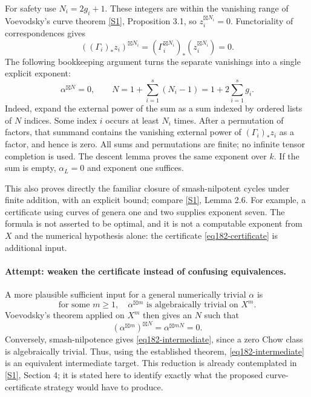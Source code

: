 \documentclass[11pt,a4paper]{article}
\newcommand{\sref}[2]{\hyperlink{source:#1:#2}{[S#2]}}
\numberwithin{equation}{section}
\begin{document}
For safety use $N_i=2g_i+1$. These integers are within the vanishing range
of Voevodsky's curve theorem \sref{30006776}{1}, Proposition 3.1, so
$z_i^{\boxtimes N_i}=0$. Functoriality of correspondences gives
\[
 ((\Gamma_i)_*z_i)^{\boxtimes N_i}
             =(\Gamma_i^{\boxtimes N_i})_*
                            (z_i^{\boxtimes N_i})=0.
\]
The following bookkeeping argument turns the separate vanishings into a
single explicit exponent:
\begin{equation}\label{eq182-exponent}
           \alpha^{\boxtimes N}=0,
             \qquad N=1+\sum_{i=1}^s(N_i-1)
                         =1+2\sum_{i=1}^s g_i.
\end{equation}
Indeed, expand the external power of the sum as a sum indexed by ordered
lists of $N$ indices. Some index $i$ occurs at least $N_i$ times. After a
permutation of factors, that summand contains the vanishing external power
of $(\Gamma_i)_*z_i$ as a factor, and hence is zero. All sums and
permutations are finite; no infinite tensor completion is used. The
descent lemma proves the same exponent over $k$. If the sum is empty,
$\alpha_L=0$ and exponent one suffices.

This also proves directly the familiar closure of smash-nilpotent cycles
under finite addition, with an explicit bound; compare
\sref{30006776}{1}, Lemma 2.6. For example, a certificate using curves of genera
one and two supplies exponent seven. The formula is not asserted to be
optimal, and it is not a computable exponent from $X$ and the numerical
hypothesis alone: the certificate \eqref{eq182-certificate} is additional
input.

\paragraph{Attempt: weaken the certificate instead of confusing equivalences.}
A more plausible sufficient input for a general numerically trivial
$\alpha$ is
\begin{equation}\label{eq182-intermediate}
 \text{for some }m\ge1,\quad
             \alpha^{\boxtimes m}\text{ is algebraically trivial on }X^m.
\end{equation}
Voevodsky's theorem applied on $X^m$ then gives an $N$ such that
\[
 (\alpha^{\boxtimes m})^{\boxtimes N}
                    =\alpha^{\boxtimes mN}=0.
\]
Conversely, smash-nilpotence gives \eqref{eq182-intermediate}, since a zero
Chow class is algebraically trivial. Thus, using the established theorem,
\eqref{eq182-intermediate} is an equivalent intermediate target. This
reduction is already contemplated in \sref{30006776}{1}, Section 4; it is
stated here to identify exactly what the proposed curve-certificate
strategy would have to produce.
\end{document}

